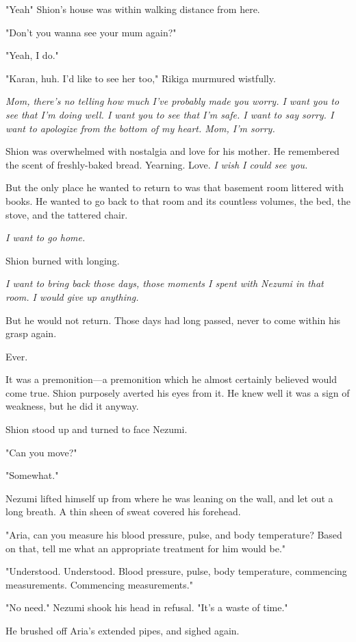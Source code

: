 "Yeah\el " Shion's house was within walking distance from here.

"Don't you wanna see your mum again?"

"Yeah, I do."

"Karan, huh. I'd like to see her too," Rikiga murmured wistfully.

\emph{Mom, there's no telling how much I've probably made you worry. I want
you to see that I'm doing well. I want you to see that I'm safe. I want
to say sorry. I want to apologize from the bottom of my heart. Mom, I'm
sorry.}

Shion was overwhelmed with nostalgia and love for his mother. He
remembered the scent of freshly-baked bread. Yearning. Love. \emph{I wish I
could see you.}

But the only place he wanted to return to was that basement room
littered with books. He wanted to go back to that room and its countless
volumes, the bed, the stove, and the tattered chair.

\emph{I want to go home.}

Shion burned with longing.

\emph{I want to bring back those days, those moments I spent with Nezumi in
that room. I would give up anything.}

But he would not return. Those days had long passed, never to come
within his grasp again.

Ever.

It was a premonition---a premonition which he almost certainly believed
would come true. Shion purposely averted his eyes from it. He knew well
it was a sign of weakness, but he did it anyway.

Shion stood up and turned to face Nezumi.

"Can you move?"

"Somewhat."

Nezumi lifted himself up from where he was leaning on the wall, and let
out a long breath. A thin sheen of sweat covered his forehead.

"Aria, can you measure his blood pressure, pulse, and body temperature?
Based on that, tell me what an appropriate treatment for him would be."

{\sffamily "Understood. Understood. Blood pressure, pulse, body temperature,
commencing measurements. Commencing measurements."}

"No need." Nezumi shook his head in refusal. "It's a waste of time."

He brushed off Aria's extended pipes, and sighed again.

